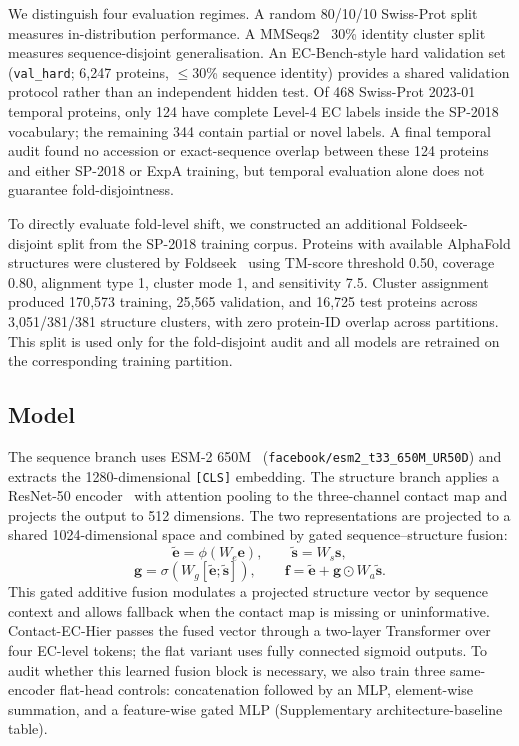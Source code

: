 \documentclass[namedate,contemporary,mediumone]{oup-authoring-template}
\begin{document}
We distinguish four evaluation regimes. A random 80/10/10 Swiss-Prot split measures
in-distribution performance. A MMSeqs2~\citep{steinegger2017} 30\% identity cluster split measures
sequence-disjoint generalisation. An EC-Bench-style hard validation set
(\texttt{val\_hard}; 6{,}247 proteins, $\leq$30\% sequence identity) provides a
shared validation protocol rather than an independent hidden test. Of 468
Swiss-Prot 2023-01 temporal proteins, only 124 have complete Level-4 EC labels
inside the SP-2018 vocabulary; the remaining 344 contain partial or novel labels.
A final temporal audit found no accession or exact-sequence overlap between these
124 proteins and either SP-2018 or ExpA training, but temporal evaluation alone
does not guarantee fold-disjointness.

To directly evaluate fold-level shift, we constructed an additional
Foldseek-disjoint split from the SP-2018 training corpus. Proteins with available
AlphaFold structures were clustered by Foldseek~\citep{vankempen2024} using TM-score threshold 0.50,
coverage 0.80, alignment type 1, cluster mode 1, and sensitivity 7.5. Cluster
assignment produced 170{,}573 training, 25{,}565 validation, and 16{,}725 test
proteins across 3{,}051/381/381 structure clusters, with zero protein-ID overlap
across partitions. This split is used only for the fold-disjoint audit and all
models are retrained on the corresponding training partition.

\subsection{Model}

The sequence branch uses ESM-2 650M~\citep{lin2023}
(\texttt{facebook/esm2\_t33\_650M\_UR50D}) and extracts the 1280-dimensional
\texttt{[CLS]} embedding. The structure branch applies a ResNet-50 encoder~\citep{he2016} with
attention pooling to the three-channel contact map and projects the output to 512
dimensions. The two representations are projected to a shared 1024-dimensional
space and combined by gated sequence--structure fusion:
\[
\tilde{\mathbf{e}} = \phi(W_e\mathbf{e}), \qquad
\tilde{\mathbf{s}} = W_s\mathbf{s},
\]
\[
\mathbf{g} = \sigma(W_g[\tilde{\mathbf{e}};\tilde{\mathbf{s}}]),
\qquad
\mathbf{f} = \tilde{\mathbf{e}} + \mathbf{g}\odot W_a\tilde{\mathbf{s}}.
\]
This gated additive fusion modulates a projected structure vector by sequence
context and allows fallback when the contact map is missing or uninformative.
Contact-EC-Hier passes the fused vector through a two-layer Transformer over four
EC-level tokens; the flat variant uses fully connected sigmoid outputs.
To audit whether this learned fusion block is necessary, we also train three
same-encoder flat-head controls: concatenation followed by an MLP, element-wise
summation, and a feature-wise gated MLP (Supplementary architecture-baseline
table).
\end{document}
